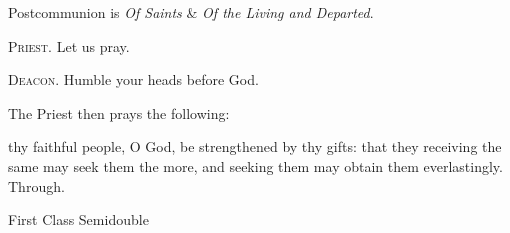 \begin{rubric}
     Postcommunion is \emph{Of Saints} \&  \emph{Of the Living and Departed}.
\end{rubric}

\textsc{Priest.} Let us pray.\par
\textsc{Deacon.} Humble your heads before God.\par
\begin{rubric}
    The Priest then prays the following:
\end{rubric}
 thy faithful people, O God, be strengthened by thy gifts: that they receiving the same may seek them the more, and seeking them may obtain them everlastingly. Through.


\fancyhead[RE,LO]{}
\begin{inhead}
    {First Class Semidouble}
\end{inhead}

